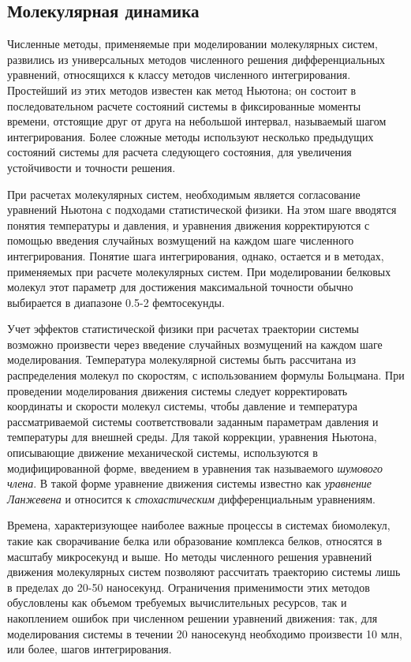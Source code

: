 
\subsection{Молекулярная динамика}

Численные методы, применяемые при моделировании молекулярных систем, развились из универсальных методов численного решения дифференциальных уравнений, относящихся к классу методов численного интегрирования. Простейший из этих методов известен как метод Ньютона; он состоит в последовательном расчете состояний системы в фиксированные моменты времени, отстоящие друг от друга на небольшой интервал, называемый шагом интегрирования. Более сложные методы используют несколько предыдущих состояний системы для расчета следующего состояния, для увеличения устойчивости и точности решения. 

При расчетах молекулярных систем, необходимым является согласование уравнений Ньютона с подходами статистической физики. На этом шаге вводятся понятия температуры и давления, и уравнения движения корректируются с помощью введения случайных возмущений на каждом шаге численного интегрирования. Понятие шага интегрирования, однако, остается и в методах, применяемых при расчете молекулярных систем. При моделировании белковых молекул этот параметр для достижения максимальной точности обычно выбирается в диапазоне 0.5-2 фемтосекунды.

Учет эффектов статистической физики при расчетах траектории системы возможно произвести через введение случайных возмущений на каждом шаге моделирования. Температура молекулярной системы быть рассчитана из распределения молекул по скоростям, с использованием формулы Больцмана.  При проведении моделирования движения системы следует корректировать координаты и скорости молекул системы, чтобы давление и температура рассматриваемой системы соответствовали заданным параметрам давления и температуры для внешней среды. Для такой коррекции, уравнения Ньютона, описывающие движение механической системы, используются в модифицированной форме, введением в уравнения так называемого \textit{шумового члена}. В такой форме уравнение движения системы известно как \textit{уравнение Ланжевена} и относится к \textit{стохастическим} дифференциальным уравнениям. 

Времена, характеризующее наиболее важные процессы в системах биомолекул, такие как сворачивание белка или образование комплекса белков, относятся в масштабу микросекунд и выше. Но методы численного решения уравнений движения молекулярных систем позволяют рассчитать траекторию системы лишь в пределах до 20-50 наносекунд. Ограничения применимости этих методов обусловлены как объемом требуемых вычислительных ресурсов, так и накоплением ошибок при численном решении уравнений движения: так, для моделирования системы в течении 20 наносекунд необходимо произвести 10 млн, или более, шагов интегрирования.

